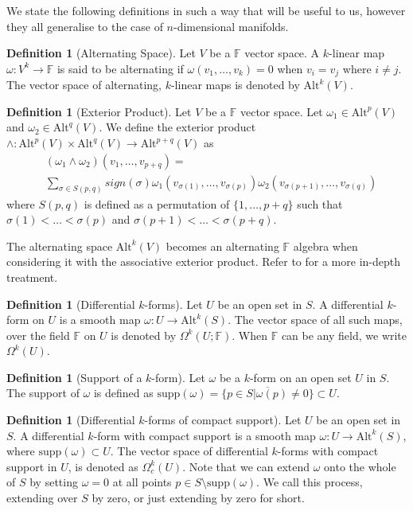 \documentclass[11pt]{report}
\theoremstyle{definition}
\newtheorem{defn}[thm]{Definition}
\begin{document}
We state the following definitions in such a way that will be useful to us, however they all generalise to the case of $n$-dimensional manifolds.
\begin{defn}[Alternating Space]\label{AltSpc}
  Let $V$ be a $\mathbb{F}$ vector space. A $k$-linear map $\omega:V^k\rightarrow \mathbb{F}$ is said to be alternating if $\omega(v_1,\ldots,v_k)=0$ when $v_i=v_j$ where $i\neq j$. The vector space of alternating, $k$-linear maps is denoted by $\text{Alt}^k(V)$.
\end{defn}
\begin{defn}[Exterior Product]
  Let $V$ be a $\mathbb{F}$ vector space. Let $\omega_1 \in \text{Alt}^p(V)$ and $\omega_2 \in \text{Alt}^q(V)$. We define the exterior product $\wedge : \text{Alt}^p(V) \times \text{Alt}^q(V) \rightarrow \text{Alt}^{p+q}(V)$ as 
  \begin{align*}
    &(\omega_1 \wedge \omega_2)(v_1,\ldots,v_{p+q})= \\
    &\sum_{\sigma \in S(p,q)}sign(\sigma)\omega_1(v_{\sigma(1)},\ldots,v_{\sigma(p)})\omega_2(v_{\sigma(p+1)},\ldots,v_{\sigma(q)})
  \end{align*}
  where $S(p,q)$ is defined as a permutation of $\{1,\ldots,p+q\}$ such that $\sigma(1) < \ldots < \sigma(p)$ and $\sigma(p+1) < \ldots < \sigma(p+q)$.
\end{defn}
The alternating space $\text{Alt}^k(V)$ becomes an alternating $\mathbb{F}$ algebra when considering it with the associative exterior product. Refer to \cite[p.11]{calcohomo} for a more in-depth treatment.

\begin{defn}[Differential $k$-forms]\label{k-form}
  Let $U$ be an open set in $S$. A differential $k$-form on $U$ is a smooth map $\omega : U \rightarrow \text{Alt}^k(S)$. The vector space of all such maps, over the field $\mathbb{F}$ on $U$ is denoted by $\Omega^k(U;\mathbb{F})$. When $\mathbb{F}$ can be any field, we write $\Omega^k(U)$.
\end{defn}

\begin{defn}[Support of a $k$-form]
  Let $\omega$ be a $k$-form on an open set $U$ in $S$. The support of $\omega$ is defined as $\text{supp}(\omega) = \overline{\{p \in S \vert \omega(p) \neq 0\}} \subset U$.
\end{defn}

\begin{defn}[Differential $k$-forms of compact support]
  Let $U$ be an open set in $S$. A differential $k$-form with compact support is a smooth map $\omega : U \rightarrow \text{Alt}^k(S)$, where $\text{supp}(\omega) \subset U$. The vector space of differential $k$-forms with compact support in $U$, is denoted as $\Omega_c^k(U)$. Note that we can extend $\omega$ onto the whole of $S$ by setting $\omega = 0$ at all points $p \in S \setminus \text{supp}(\omega)$. We call this process, extending over $S$ by zero, or just extending by zero for short.
\end{defn}
\end{document}
